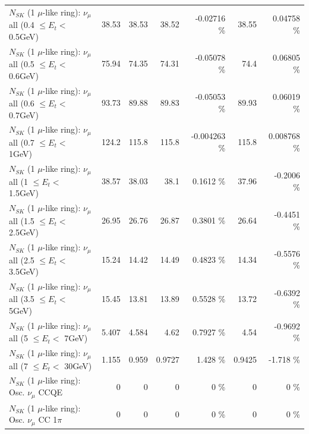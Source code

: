 \begin{table}
\begin{tabular}{| l | r | r | r  r | r  r |}
       $N_{SK}$ (1 $\mu$-like ring): $\nu_{\mu}$ all (0.4 $\leq E_{t} <$ 0.5GeV) &           38.53 &           38.53 &           38.52 & -0.02716 \%  &           38.55 &  0.04758 \%  \\ 
       $N_{SK}$ (1 $\mu$-like ring): $\nu_{\mu}$ all (0.5 $\leq E_{t} <$ 0.6GeV) &           75.94 &           74.35 &           74.31 & -0.05078 \%  &            74.4 &  0.06805 \%  \\ 
       $N_{SK}$ (1 $\mu$-like ring): $\nu_{\mu}$ all (0.6 $\leq E_{t} <$ 0.7GeV) &           93.73 &           89.88 &           89.83 & -0.05053 \%  &           89.93 &  0.06019 \%  \\ 
         $N_{SK}$ (1 $\mu$-like ring): $\nu_{\mu}$ all (0.7 $\leq E_{t} <$ 1GeV) &           124.2 &           115.8 &           115.8 & -0.004263 \%  &           115.8 & 0.008768 \%  \\ 
         $N_{SK}$ (1 $\mu$-like ring): $\nu_{\mu}$ all (1 $\leq E_{t} <$ 1.5GeV) &           38.57 &           38.03 &            38.1 &   0.1612 \%  &           37.96 &  -0.2006 \%  \\ 
       $N_{SK}$ (1 $\mu$-like ring): $\nu_{\mu}$ all (1.5 $\leq E_{t} <$ 2.5GeV) &           26.95 &           26.76 &           26.87 &   0.3801 \%  &           26.64 &  -0.4451 \%  \\ 
       $N_{SK}$ (1 $\mu$-like ring): $\nu_{\mu}$ all (2.5 $\leq E_{t} <$ 3.5GeV) &           15.24 &           14.42 &           14.49 &   0.4823 \%  &           14.34 &  -0.5576 \%  \\ 
         $N_{SK}$ (1 $\mu$-like ring): $\nu_{\mu}$ all (3.5 $\leq E_{t} <$ 5GeV) &           15.45 &           13.81 &           13.89 &   0.5528 \%  &           13.72 &  -0.6392 \%  \\ 
           $N_{SK}$ (1 $\mu$-like ring): $\nu_{\mu}$ all (5 $\leq E_{t} <$ 7GeV) &           5.407 &           4.584 &            4.62 &   0.7927 \%  &            4.54 &  -0.9692 \%  \\ 
          $N_{SK}$ (1 $\mu$-like ring): $\nu_{\mu}$ all (7 $\leq E_{t} <$ 30GeV) &           1.155 &           0.959 &          0.9727 &    1.428 \%  &          0.9425 &   -1.718 \%  \\ 
\hline
\hline
                               $N_{SK}$ (1 $\mu$-like ring): Osc. $\nu_\mu$ CCQE &               0 &               0 &               0 &        0 \%  &               0 &        0 \%  \\ 
                          $N_{SK}$ (1 $\mu$-like ring): Osc. $\nu_\mu$ CC 1$\pi$ &               0 &               0 &               0 &        0 \%  &               0 &        0 \%  \\ 

\end{tabular}
\end{table}
